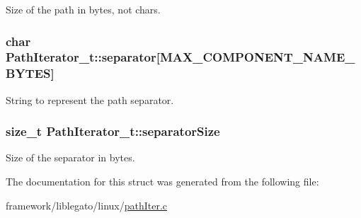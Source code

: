 Size of the path in bytes, not chars. 

\subsubsection[{\texorpdfstring{separator}{separator}}]{\setlength{\rightskip}{0pt plus 5cm}char Path\+Iterator\+\_\+t\+::separator\mbox{[}{\bf M\+A\+X\+\_\+\+C\+O\+M\+P\+O\+N\+E\+N\+T\+\_\+\+N\+A\+M\+E\+\_\+\+B\+Y\+T\+ES}\mbox{]}}\hypertarget{struct_path_iterator__t_a0b8006bf2a1114f3a8ff9385c55cc72f}{}\label{struct_path_iterator__t_a0b8006bf2a1114f3a8ff9385c55cc72f}


String to represent the path separator. 

\subsubsection[{\texorpdfstring{separator\+Size}{separatorSize}}]{\setlength{\rightskip}{0pt plus 5cm}size\+\_\+t Path\+Iterator\+\_\+t\+::separator\+Size}\hypertarget{struct_path_iterator__t_aebae122f0fd185e15bb23113b32e557c}{}\label{struct_path_iterator__t_aebae122f0fd185e15bb23113b32e557c}


Size of the separator in bytes. 



The documentation for this struct was generated from the following file\+:\begin{DoxyCompactItemize}
\item 
framework/liblegato/linux/\hyperlink{path_iter_8c}{path\+Iter.\+c}\end{DoxyCompactItemize}
